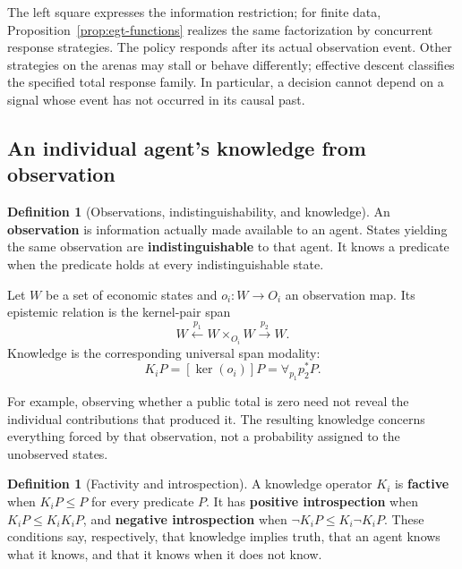 \documentclass[11pt,a4paper]{article}
\numberwithin{equation}{section}
\theoremstyle{definition}
\newtheorem{definition}[theorem]{Definition}
\theoremstyle{remark}
\theoremstyle{plain}
\begin{document}
The left square expresses the information restriction; for finite
data, Proposition~\ref{prop:egt-functions} realizes the same factorization
by concurrent response strategies. The policy responds after its actual
observation event. Other strategies on the arenas may stall or behave
differently; effective descent classifies the specified total response
family. In particular, a decision cannot depend on a signal whose event
has not occurred in its causal past.

\subsection{An individual agent's knowledge from observation}

\begin{definition}[Observations, indistinguishability, and knowledge]
\label{def:egt-observations-indistinguishability-and-knowledge}
An \textbf{observation} is information actually made available to an
agent. States yielding the same observation are
\textbf{indistinguishable} to that agent. It knows a predicate when the
predicate holds at every indistinguishable state.

Let $W$ be a set of economic states and $o_i:W\to O_i$ an observation
map. Its epistemic relation is the kernel-pair span
\[
 W\xleftarrow{p_1}W\times_{O_i}W\xrightarrow{p_2}W.
\]
Knowledge is the corresponding universal span modality:
\begin{equation}
\label{eq:egt-knowledge-span}
 K_iP
 =[\operatorname{ker}(o_i)]P
 =\forall_{p_1}p_2^*P.
\end{equation}
\end{definition}

For example, observing
whether a public total is zero need not reveal the individual contributions
that produced it. The resulting knowledge concerns everything forced by
that observation, not a probability assigned to the unobserved states.

\begin{definition}[Factivity and introspection]
\label{def:egt-factivity-introspection}
A knowledge operator $K_i$ is \textbf{factive} when $K_iP\leq P$ for every
predicate $P$. It has \textbf{positive introspection} when $K_iP\leq K_iK_iP$,
and \textbf{negative introspection} when $\neg K_iP\leq K_i\neg K_iP$.
These conditions say, respectively, that knowledge implies truth, that an
agent knows what it knows, and that it knows when it does not know.
\end{definition}
\end{document}
